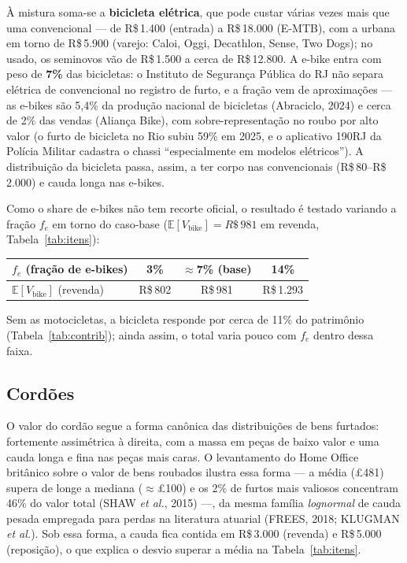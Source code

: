 \documentclass[11pt,a4paper]{article}
\newcommand{\reais}[1]{R\$\,#1}
\begin{document}
À mistura soma-se a \textbf{bicicleta elétrica}, que pode custar várias vezes mais que uma
convencional --- de \reais{1.400} (entrada) a \reais{18.000} (E-MTB), com a urbana em torno de
\reais{5.900} (varejo: Caloi, Oggi, Decathlon, Sense, Two Dogs); no usado, os seminovos vão de
\reais{1.500} a cerca de \reais{12.800}. A e-bike entra com peso de \textbf{7\%} das bicicletas: o
Instituto de Segurança Pública do RJ não separa elétrica de convencional no registro de furto, e a
fração vem de aproximações --- as e-bikes são 5,4\% da produção nacional de bicicletas (Abraciclo,
2024) e cerca de 2\% das vendas (Aliança Bike), com sobre-representação no roubo por alto valor (o
furto de bicicleta no Rio subiu 59\% em 2025, e o aplicativo 190RJ da Polícia Militar cadastra o
chassi ``especialmente em modelos elétricos''). A distribuição da bicicleta passa, assim, a ter
corpo nas convencionais (\reais{80}--\reais{2.000}) e cauda longa nas e-bikes.

Como o share de e-bikes não tem recorte oficial, o resultado é testado variando a fração $f_e$ em
torno do caso-base ($\mathbb{E}[V_{\text{bike}}]=\reais{981}$ em revenda, Tabela~\ref{tab:itens}):
\begin{center}\small
\begin{tabular}{lccc}
\toprule
$f_e$ (fração de e-bikes) & 3\% & $\approx$7\% (base) & 14\% \\
\midrule
$\mathbb{E}[V_{\text{bike}}]$ (revenda) & \reais{802} & \reais{981} & \reais{1.293} \\
\bottomrule
\end{tabular}
\end{center}
Sem as motocicletas, a bicicleta responde por cerca de 11\% do patrimônio
(Tabela~\ref{tab:contrib}); ainda assim, o total varia pouco com $f_e$ dentro dessa faixa.

\subsection{Cordões}
O valor do cordão segue a forma canônica das distribuições de bens furtados: fortemente
assimétrica à direita, com a massa em peças de baixo valor e uma cauda longa e fina nas peças mais
caras. O levantamento do Home Office britânico sobre o valor de bens roubados ilustra essa forma
--- a média (\pounds481) supera de longe a mediana ($\approx$\pounds100) e os 2\% de furtos mais
valiosos concentram 46\% do valor total (SHAW \emph{et al.}, 2015) ---, da mesma família
\emph{lognormal} de cauda pesada empregada para perdas na literatura atuarial (FREES, 2018; KLUGMAN
\emph{et al.}). Sob essa forma, a cauda fica contida em \reais{3.000} (revenda) e \reais{5.000}
(reposição), o que explica o desvio superar a média na Tabela~\ref{tab:itens}.
\end{document}
